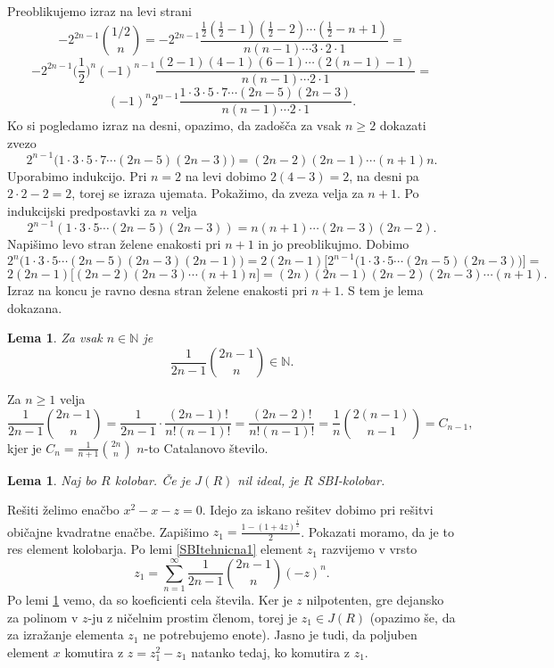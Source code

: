 \documentclass[a4paper, 12pt]{amsart}
\theoremstyle{definition} %
\theoremstyle{plain} %
\newtheorem{lema}[definicija]{Lema}
\newcommand{\N}{\mathbb N}
\begin{document}
Preoblikujemo izraz na levi strani
$$
-2^{2n-1} {1/2 \choose n} = -2^{2n-1} \frac{\frac{1}{2}(\frac{1}{2}-1)(\frac{1}{2} - 2)\cdots(\frac{1}{2} - n+1) }{n(n-1)\cdots 3 \cdot 2 \cdot 1} =
$$
$$
-2^{2n-1}\big(\frac{1}{2}\big)^n (-1)^{n-1} \frac{(2-1)(4-1)(6-1)\cdots (2(n-1)-1)}{n(n-1)\cdots 2 \cdot1} = 
$$
$$
(-1)^n 2^{n-1} \frac{1\cdot 3 \cdot 5 \cdot 7 \cdots (2n-5)(2n-3)}{n(n-1)\cdots 2\cdot1}.
$$
Ko si pogledamo izraz na desni, opazimo, da zadošča za vsak $n\ge 2$ dokazati zvezo
$$
2^{n-1}\big( 1\cdot 3 \cdot 5 \cdot 7 \cdots(2n-5)(2n-3)   \big) = (2n-2) (2n-1) \cdots (n+1) n.
$$
Uporabimo indukcijo. Pri $n=2$ na levi dobimo $2(4-3) = 2$, na desni pa $2\cdot 2 - 2 = 2$, torej se izraza ujemata. Pokažimo, da zveza velja za $n+1$. Po indukcijski predpostavki za $n$ velja 
$$
2^{n-1} (1\cdot 3\cdot 5 \cdots (2n-5)(2n-3)) = n(n+1)\cdots (2n-3)(2n-2).
$$
Napišimo levo stran želene enakosti pri $n+1$ in jo preoblikujmo. Dobimo
$$
2^n \big(1\cdot 3 \cdot 5 \cdots (2n-5)(2n-3)(2n-1)\big) = 2(2n-1) \big[2^{n-1}\big(1\cdot 3 \cdot 5 \cdots (2n-5)(2n-3) \big)\big]=
$$
$$
2(2n-1) \big[(2n-2)(2n-3)\cdots(n+1)n\big] = (2n)(2n-1)(2n-2)(2n-3)\cdots (n+1).
$$
Izraz na koncu je ravno desna stran želene enakosti pri $n+1$. S tem je lema dokazana.
\endproof

\begin{lema}
\label{SBItehnicna2}
Za vsak $n\in \N$ je 
$$
\frac{1}{2n-1} {2n-1 \choose n} \in \N.
$$
\end{lema}

\proof
Za $n\ge 1$ velja 
$$
\frac{1}{2n-1} {2n-1 \choose n} = \frac{1}{2n-1}\cdot\frac{(2n-1)!}{n! (n-1)!} = \frac{(2n-2)!}{n!(n-1)!} = \frac{1}{n} {2(n-1) \choose n-1} = C_{n-1},
$$
kjer je $C_n = \frac{1}{n+1}{2n \choose n}$ $n$-to Catalanovo število. 
\endproof

\begin{lema}
\label{nilJeSBI}
Naj bo $R$ kolobar. Če je $J(R)$ nil ideal, je $R$ SBI-kolobar.
\end{lema}

\proof
Rešiti želimo enačbo $x^2 - x - z = 0$. Idejo za iskano rešitev dobimo pri rešitvi običajne kvadratne enačbe. Zapišimo $z_1 = \frac{1-(1+4z)^{\frac{1}{2}}}{2}$. Pokazati moramo, da je to res element kolobarja. Po lemi \ref{SBItehnicna1} element $z_1$ razvijemo v vrsto
$$
z_1 = \sum_{n=1}^{\infty} \frac{1}{2n-1} \binom{2n-1}{n}(-z)^n.
$$
Po lemi \ref{SBItehnicna2} vemo, da so koeficienti cela števila. Ker je $z$ nilpotenten, gre dejansko za polinom v $z$-ju z ničelnim prostim členom, torej je $z_1 \in J(R)$ (opazimo še, da za izražanje elementa $z_1$ ne potrebujemo enote). Jasno je tudi, da poljuben element $x$ komutira z $z=z_1^2 - z_1$ natanko tedaj, ko komutira z $z_1$.
\endproof
\end{document}
